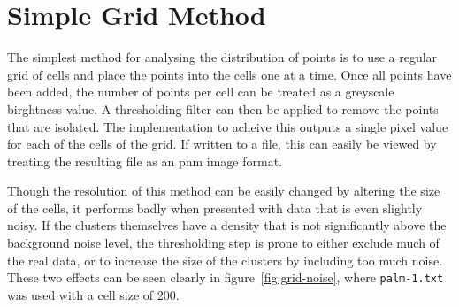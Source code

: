 \section{Simple Grid Method}
\label{sec:simple_grid_method}

The simplest method for analysing the distribution of points is to use a
regular grid of cells and place the points into the cells one at a time. Once
all points have been added, the number of points per cell can be treated as a
greyscale birghtness value. A thresholding filter can then be applied to remove
the points that are isolated. The implementation to acheive this outputs a
single pixel value for each of the cells of the grid. If written to a file,
this can easily be viewed by treating the resulting file as an pnm image
format.

Though the resolution of this method can be easily changed by altering the size
of the cells, it performs badly when presented with data that is even slightly
noisy. If the clusters themselves have a density that is not significantly
above the background noise level, the thresholding step is prone to either
exclude much of the real data, or to increase the size of the clusters by
including too much noise. These two effects can be seen clearly in
figure~\ref{fig:grid-noise}, where \texttt{palm-1.txt} was used with a cell
size of 200.

